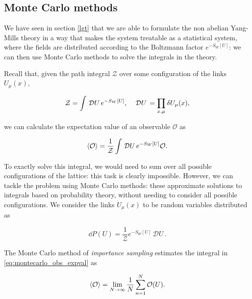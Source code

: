 \documentclass[reqno,12pt]{article}
\numberwithin{equation}{section}
\newcommand{\D}[1]{\,\mathcal{D}#1\,}
\newcommand{\Z}{\mathcal{Z}}
\begin{document}
\subsection{Monte Carlo methods} \label{montecarlo}

We have seen in section \ref{lgt} that we are able to formulate the non abelian Yang-Mills theory in a way
that makes the system treatable as a statistical system, where the fields are distributed according to the Boltzmann
factor $e^{-S_W[U]}$: we can then use Monte Carlo methods to solve the integrals in the theory. 

Recall that, given the path integral $\Z$ over some configuration of the links $U_\mu(x)$,

\begin{equation}
	\Z = \int \D U e^{-S_W[U]} \qc \D U = \prod_{x,\mu} \delta U_\mu(x),
\end{equation}

we can calculate the expectation value of an observable $\mathcal{O}$ as

\begin{equation} \label{eq:montecarlo_obs_expval}
	\expval{\mathcal{O}} = \frac{1}{\Z} \int \D U e^{-S_W[U]} \mathcal{O}.
\end{equation}

To exactly solve this integral, we would need to sum over all possible configurations of the lattice: this task is
clearly impossible. However, we can tackle the problem using Monte Carlo methods: 
these approximate solutions to integrals based on probability theory, without needing
to consider all possible configurations. We consider the links $U_\mu(x)$ to be random variables distributed as

\begin{equation} \label{eq:mc_links_probdist}
	\dd{P(U)} = \frac{1}{\Z} e^{-S_W[U]} \D U.
\end{equation}

The Monte Carlo method of \textit{importance sampling} estimates the integral in \eqref{eq:montecarlo_obs_expval} as

\begin{equation} \label{eq:mc_estimate_obs}
	\expval{\mathcal{O}} = \lim_{N \rightarrow \infty} \frac{1}{N} \sum_{n=1}^N \mathcal{O}(U).
\end{equation}
\end{document}
